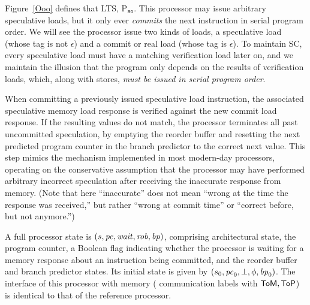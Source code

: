 Figure~\ref{Ooo} defines that LTS,
P$_{\texttt{so}}$. This processor may issue arbitrary speculative
loads, but it only ever \emph{commits} the next instruction in serial
program order. 
We will see the processor issue two kinds of loads, a speculative
load (whose tag is not $\epsilon$) and a commit or real load (whose tag is $\epsilon$).  To maintain SC, every speculative
load must have a matching verification load later on, and we maintain
the illusion that the program only depends on the results of
verification loads, which, along with stores, \emph{must be issued in
serial program order}.

When committing a
previously issued speculative load instruction, the associated speculative
memory load response is verified against the new commit load response. If the
resulting values do not match, the processor terminates all past uncommitted
speculation, by emptying the reorder buffer and resetting the
next predicted program counter in the branch predictor to the correct next value. This step mimics
the mechanism implemented in most modern-day processors, operating on the
conservative assumption that the processor may have performed arbitrary
incorrect speculation after receiving the inaccurate response from
memory.  (Note that here ``inaccurate'' does not mean ``wrong at
the time the response was received,'' but rather ``wrong at commit
time'' or ``correct before, but not anymore.'')

A full processor state is $(s, \mathit{pc}, \mathit{wait}, \mathit{rob}, \mathit{bp})$, comprising
architectural state, the program counter, a Boolean flag indicating
whether the processor is waiting for a memory response about an
instruction being committed, and the reorder buffer and branch
predictor states. Its initial state is given by $(s_0, \mathit{pc}_0, \bot, \phi, \mathit{bp}_0)$.
The interface of this processor with memory (\ie{}
communication labels with $\mathsf{ToM}, \mathsf{ToP}$) is identical
to that of the reference processor.


